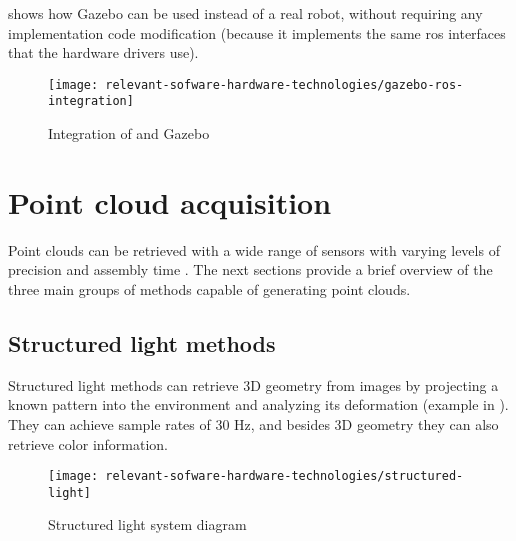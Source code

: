  shows how Gazebo can be used instead of a real robot, without requiring any implementation code modification (because it implements the same \gls{ros} interfaces that the hardware drivers use).

\begin{figure}[ht]
	\centering
	\texttt{[image: relevant-sofware-hardware-technologies/gazebo-ros-integration]}
	\caption[Integration of  and Gazebo]{Integration of  and Gazebo\protect\footnotemark}
	\label{fig:relevant-sofware-hardware-technologies_gazebo-ros-integration}
\end{figure}

\clearpage



\section{Point cloud acquisition}

Point clouds can be retrieved with a wide range of sensors with varying levels of precision and assembly time \cite{Sansoni2009}. The next sections provide a brief overview of the three main groups of methods capable of generating point clouds.


\subsection{Structured light methods}

Structured light methods can retrieve 3D geometry from images by projecting a known pattern into the environment and analyzing its deformation (example in ). They can achieve sample rates of 30 Hz, and besides 3D geometry they can also retrieve color information.

\begin{figure}[H]
	\centering
	\texttt{[image: relevant-sofware-hardware-technologies/structured-light]}
	\caption[Structured light system diagram]{Structured light system diagram\protect\footnotemark}
	\label{fig:relevant-sofware-hardware-technologies_structured-light}
\end{figure}


